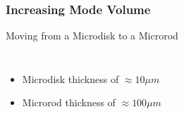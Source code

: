 \documentclass{beamer}
\begin{document}
\begin{frame}\frametitle{Increasing Mode Volume}

\begin{block}{Moving from a Microdisk to a Microrod}
\begin{columns}
\begin{itemize}
\item Microdisk thickness of $\approx 10\mu m$ 
\linebreak
\linebreak
\linebreak
\linebreak
\linebreak
\item Microrod thickness of $\approx 100\mu m$
\end{itemize}


\end{columns}
\end{block}
\end{frame}
\end{document}
